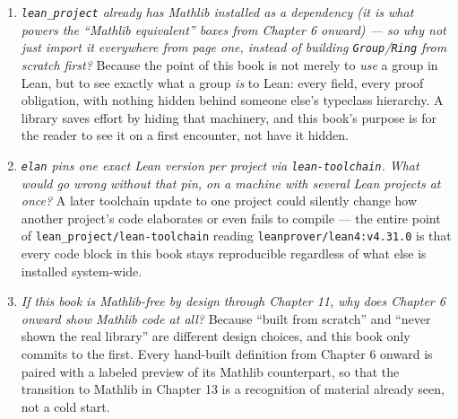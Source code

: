 \begin{enumerate}
\def\labelenumi{\arabic{enumi}.}
\tightlist
\item
  \emph{\texttt{lean\_\allowbreak{}project} already has Mathlib installed as a dependency (it is what powers the ``Mathlib equivalent'' boxes from Chapter 6 onward) --- so why not just import it everywhere from page one, instead of building \texttt{Group}/\texttt{Ring} from scratch first?} Because the point of this book is not merely to \emph{use} a group in Lean, but to see exactly what a group \emph{is} to Lean: every field, every proof obligation, with nothing hidden behind someone else's typeclass hierarchy. A library saves effort by hiding that machinery, and this book's purpose is for the reader to see it on a first encounter, not have it hidden.
\item
  \emph{\texttt{elan} pins one exact Lean version per project via \texttt{lean-\allowbreak{}toolchain}. What would go wrong without that pin, on a machine with several Lean projects at once?} A later toolchain update to one project could silently change how another project's code elaborates or even fails to compile --- the entire point of \texttt{lean\_\allowbreak{}project/\allowbreak{}lean-\allowbreak{}toolchain} reading \texttt{leanprover/\allowbreak{}lean4:v4.31.0} is that every code block in this book stays reproducible regardless of what else is installed system-wide.
\item
  \emph{If this book is Mathlib-free by design through Chapter 11, why does Chapter 6 onward show Mathlib code at all?} Because ``built from scratch'' and ``never shown the real library'' are different design choices, and this book only commits to the first. Every hand-built definition from Chapter 6 onward is paired with a labeled preview of its Mathlib counterpart, so that the transition to Mathlib in Chapter 13 is a recognition of material already seen, not a cold start.
\end{enumerate}

